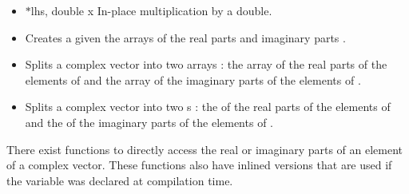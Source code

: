 \begin{itemize}
\item {}
  { $\ast$lhs, double x}
  \sshortdescribe In-place multiplication by a double.

\item {}
  \sshortdescribe Creates a  given the arrays of the
  real parts  and imaginary parts .
\item {}
  \sshortdescribe Splits a complex vector into two arrays : the array of the
  real parts of the elements of  and the array of the imaginary parts
  of the elements of .
\item {}
  \sshortdescribe Splits a complex vector into two s : the
   of the real parts of the elements of  and the
   of the imaginary parts of the elements of .
\end{itemize}

There exist functions to directly access the real or imaginary parts of an
element of a complex vector. These functions also have inlined versions that
are used if the variable  was declared at compilation time.


